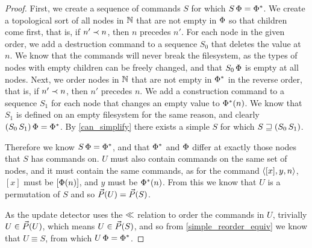 \begin{proof}
First, we create a sequence of commands $S$ for which $S\,\Phi=\Phi^*$.
We create a topological sort of all nodes in $\mathbb{N}$ that are
not empty in $\Phi$ so that children come first,
that is, if $n'\prec n$, then $n$ precedes $n'$.
For each node in the given order, we add a destruction command to a sequence $S_0$
that deletes the value at $n$.
We know that the commands will never break the filesystem, as the types of nodes
with empty children can be freely changed, and that $S_0\,\Phi$ is empty at all nodes.
Next, we order nodes in $\mathbb{N}$ that are not empty in $\Phi^*$ in the reverse order,
that is, if $n'\prec n$, then $n'$ precedes $n$.
We add a construction command to a sequence $S_1$ for each node that changes an empty value
to $\Phi^*(n)$.
We know that $S_1$ is defined on an empty filesystem for the same reason,
and clearly $(S_0\, S_1)\,\Phi=\Phi^*$.
By \cref{can_simplify} there exists a simple $S$ for which $S\sqsupseteq (S_0\, S_1)$.

Therefore we know $S\,\Phi=\Phi^*$, and that
$\Phi^*$ and $\Phi$ differ at exactly those nodes that $S$ has commands on.
$U$ must also contain commands on the same set of nodes,
and it must contain the same commands,
as for the command $\langle{[x],y,n}\rangle$, $[x]$ must be $[\Phi(n)]$, and $y$ must be $\Phi^*(n)$.
From this we know that $U$ is a permutation of $S$ and so $\vec{P}({U})=\vec{P}({S})$.

As the update detector uses the $\ll$ relation to order the commands in $U$, trivially $U\in\vec{P}({U})$,
which means $U\in\vec{P}({S})$,
and so from \cref{simple_reorder_equiv} we know that $U\equiv S$,
from which $U\,\Phi=\Phi^*$.
\end{proof}

